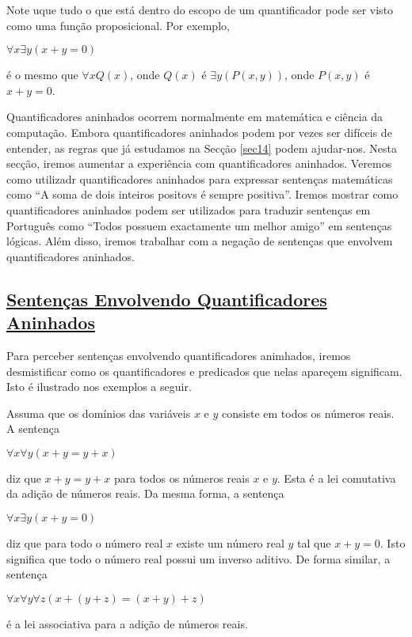 Note uque tudo o que está dentro do escopo de um quantificador pode ser visto
como uma função proposicional. Por exemplo,
\begin{center}
$\forall x\exists y(x + y = 0)$
\end{center}
é o mesmo que $\forall xQ(x)$, onde $Q(x)$ é $\exists y(P(x,y))$, onde $P(x,y)$
é $x+y=0$.

Quantificadores aninhados ocorrem normalmente em matemática e ciência da
computação. Embora quantificadores aninhados podem por vezes ser difíceis de
entender, as regras que já estudamos na Secção \ref{sec14} podem ajudar-nos.
Nesta secção, iremos aumentar a experiência com quantificadores aninhados.
Veremos como utilizadr quantificadores aninhados para expressar sentenças
matemáticas como ``A soma de dois inteiros positovs é sempre positiva''. Iremos
mostrar como quantificadores aninhados podem ser utilizados para traduzir
sentenças em Português como ``Todos possuem exactamente um melhor amigo'' em
sentenças lógicas. Além disso, iremos trabalhar com a negação de sentenças que
envolvem quantificadores aninhados.

\subsection*{\underline{Sentenças Envolvendo Quantificadores Aninhados}}

Para perceber sentenças envolvendo quantificadores animhados, iremos
desmistificar como os quantificadores e predicados que nelas apareçem
significam. Isto é ilustrado nos exemplos a seguir.

\begin{exmp}
\label{exem148}
Assuma que os domínios das variáveis $x$ e $y$ consiste em todos os números
reais. A sentença
\begin{center}
$\forall x\forall y(x+y=y+x)$
\end{center}
\end{exmp}
diz que $x+y=y+x$ para todos os números reais $x$ e $y$. Esta é a lei comutativa
da adição de números reais. Da mesma forma, a sentença
\begin{center}
$\forall x\exists y(x+y=0)$
\end{center}
diz que para todo o número real $x$ existe um número real $y$ tal que $x+y=0$.
Isto significa que todo o número real possui um inverso aditivo. De forma
similar, a sentença
\begin{center}
$\forall x\forall y\forall z(x+(y+z)=(x+y)+z)$
\end{center}
é a lei associativa para a adição de números reais.

